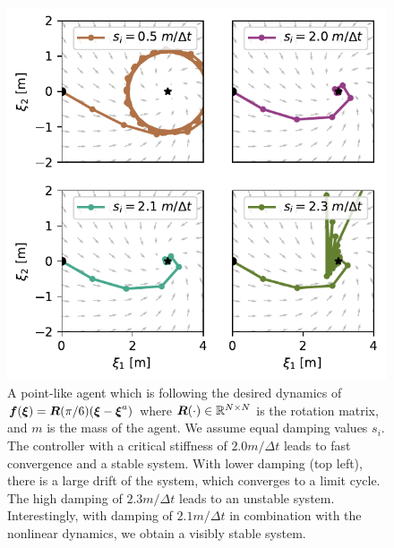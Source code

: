 \begin{figure}[htb]
\centering
  \includegraphics[width=\columnwidth]{figures/discrete_controller_parameters_comparison_stable}
\caption{A point-like agent which is following the desired dynamics of
$\boldsymbol{f}(\boldsymbol{\xi}) = \boldsymbol{R}(\pi / 6) (\boldsymbol{\xi}  - \boldsymbol{\xi}^a)$ where $\boldsymbol{R}(\cdot) \in \mathbb{R}^{N \times N}$ is the rotation matrix, and $m$ is the mass of the agent. We assume equal damping values $s_i$.
The controller with a critical stiffness of $2.0 m / \Delta t$ leads to fast convergence and a stable system. With lower damping (top left), there is a large drift of the system, which converges to a limit cycle. 
The high damping of $2.3 m / \Delta t$ leads to an unstable system. 
Interestingly, with damping of $2.1 m / \Delta t$ in combination with the nonlinear dynamics, we obtain a visibly stable system.}
  \label{fig:discrete_controller_parameters_comparison_stable}
\end{figure}


% 
